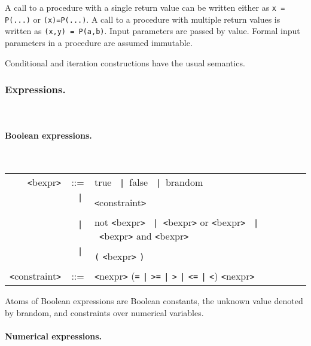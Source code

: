 \documentclass[a4paper,11pt]{article}
\newcommand{\pkw}[1]{\textcolor{progkeyword}{#1}}
\newcommand{\sx}[1]{\textcolor{prog}{\texttt{<}#1\texttt{>}}}
\newcommand{\tk}[1]{\textcolor{token}{\texttt{#1}}}
\newcommand{\sor}{\texttt{~|~}}
\newenvironment{syntax}
{
\T\medskip
\begin{tabular}{rcll}
}
{
\end{tabular}
\T\par\medskip
}
\begin{document}
A call to a procedure with a single return value can be written
either as \texttt{x = P(...)} or \texttt{(x)=P(...)}. A call to a
procedure with multiple return values is written as \texttt{(x,y)
  = P(a,b)}. Input parameters are passed by value. Formal input
parameters in a procedure are assumed immutable.

Conditional and iteration constructions have the usual semantics.

\subsubsection{Expressions.}\T~

\paragraph{Boolean expressions.}\T~

\begin{syntax}
  \sx{bexpr} &::=& \pkw{true} \sor \pkw{false} \sor \pkw{brandom} \\
  &\sor& \sx{constraint} \\
  &\sor& \pkw{not} \sx{bexpr} \sor \sx{bexpr} \pkw{or} \sx{bexpr} \sor \sx{bexpr} \pkw{and} \sx{bexpr} \\
  &\sor& \tk{(} \sx{bexpr} \tk{)} \\
  \sx{constraint} &::=& \sx{nexpr} (\tk{=} \texttt{|} \tk{>=} \texttt{|} \tk{>} \texttt{|} \tk{<=} \texttt{|} \tk{<}) \sx{nexpr}
\end{syntax}

Atoms of Boolean expressions are Boolean constants, the unknown
value denoted by \pkw{brandom}, and constraints over numerical
variables.

\paragraph{Numerical expressions.}\T~
\end{document}

